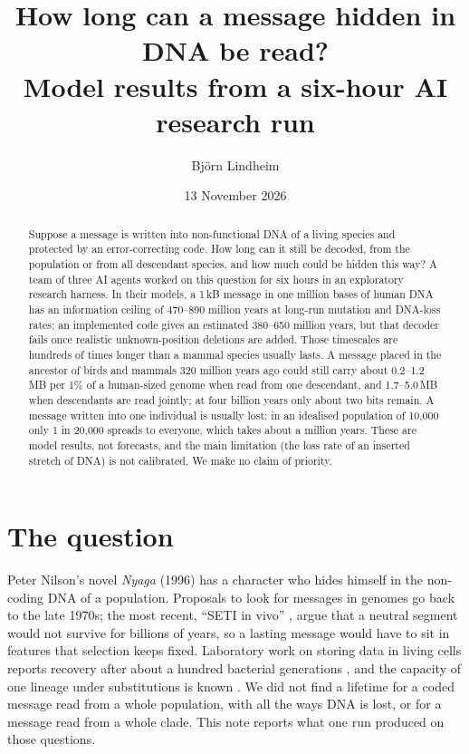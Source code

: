\documentclass[11pt]{article}
\title{How long can a message hidden in DNA be read?\\[0.3ex]\large Model results from a six-hour AI research run}
\author{Bj\"orn Lindheim}
\date{13 November 2026}
\begin{document}
\maketitle

\begin{abstract}
Suppose a message is written into non-functional DNA of a living species and protected by an error-correcting code. How long can it still be decoded, from the population or from all descendant species, and how much could be hidden this way? A team of three AI agents worked on this question for six hours in an exploratory research harness. In their models, a 1\,kB message in one million bases of human DNA has an information ceiling of 470--890 million years at long-run mutation and DNA-loss rates; an implemented code gives an estimated 380--650 million years, but that decoder fails once realistic unknown-position deletions are added. Those timescales are hundreds of times longer than a mammal species usually lasts. A message placed in the ancestor of birds and mammals 320 million years ago could still carry about 0.2--1.2\,MB per 1\% of a human-sized genome when read from one descendant, and 1.7--5.0\,MB when descendants are read jointly; at four billion years only about two bits remain. A message written into one individual is usually lost: in an idealised population of 10{,}000 only 1 in 20{,}000 spreads to everyone, which takes about a million years. These are model results, not forecasts, and the main limitation (the loss rate of an inserted stretch of DNA) is not calibrated. We make no claim of priority.
\end{abstract}

\section{The question}

Peter Nilson's novel \emph{Nyaga} (1996) has a character who hides himself in the non-coding DNA of a population. Proposals to look for messages in genomes go back to the late 1970s; the most recent, ``SETI in vivo'' \cite{shcherbak2013,makukov2018}, argue that a neutral segment would not survive for billions of years, so a lasting message would have to sit in features that selection keeps fixed. Laboratory work on storing data in living cells reports recovery after about a hundred bacterial generations \cite{xu2026}, and the capacity of one lineage under substitutions is known \cite{balado2013}. We did not find a lifetime for a coded message read from a whole population, with all the ways DNA is lost, or for a message read from a whole clade. This note reports what one run produced on those questions.
\end{document}
